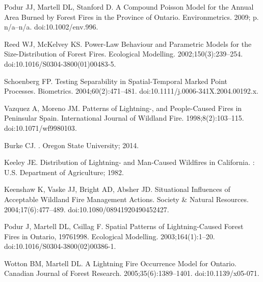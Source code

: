\documentclass[10pt,letterpaper]{article}
\begin{document}
\begin{thebibliography}{10}
Podur JJ, Martell DL, Stanford D.
\newblock A Compound Poisson Model for the Annual Area Burned by Forest Fires
  in the Province of {{Ontario}}.
\newblock Environmetrics. 2009; p. n/a--n/a.
\newblock doi:{10.1002/env.996}.

Reed WJ, McKelvey KS.
\newblock Power-Law Behaviour and Parametric Models for the Size-Distribution
  of Forest Fires.
\newblock Ecological Modelling. 2002;150(3):239--254.
\newblock doi:{10.1016/S0304-3800(01)00483-5}.

Schoenberg FP.
\newblock Testing {{Separability}} in {{Spatial}}-{{Temporal Marked Point
  Processes}}.
\newblock Biometrics. 2004;60(2):471--481.
\newblock doi:{10.1111/j.0006-341X.2004.00192.x}.

Vazquez A, Moreno JM.
\newblock Patterns of {{Lightning}}-, and {{People}}-{{Caused Fires}} in
  {{Peninsular Spain}}.
\newblock International Journal of Wildland Fire. 1998;8(2):103--115.
\newblock doi:{10.1071/wf9980103}.

Burke CJ.
.
\newblock Oregon State University; 2014.

Keeley JE.
\newblock Distribution of {{Lightning}}- and {{Man}}-{{Caused Wildfires}} in
  {{California}}.
: {U.S. Department of Agriculture}; 1982.

Keenshaw K, Vaske JJ, Bright AD, Absher JD.
\newblock Situational {{Influences}} of {{Acceptable Wildland Fire Management
  Actions}}.
\newblock Society \& Natural Resources. 2004;17(6):477--489.
\newblock doi:{10.1080/08941920490452427}.

Podur J, Martell DL, Csillag F.
\newblock Spatial Patterns of Lightning-Caused Forest Fires in {{Ontario}},
  1976\textendash{}1998.
\newblock Ecological Modelling. 2003;164(1):1--20.
\newblock doi:{10.1016/S0304-3800(02)00386-1}.

Wotton BM, Martell DL.
\newblock A Lightning Fire Occurrence Model for {{Ontario}}.
\newblock Canadian Journal of Forest Research. 2005;35(6):1389--1401.
\newblock doi:{10.1139/x05-071}.


\end{thebibliography}
\end{document}
